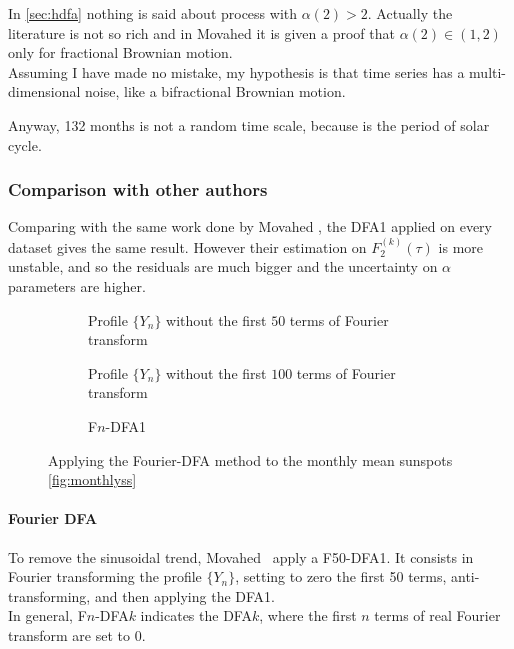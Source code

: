 In \autoref{sec:hdfa} nothing is said about process with $\alpha(2)>2$. Actually the literature is not so rich and in Movahed \etal\cite{Movahed_2006} it is given a proof that $\alpha(2) \in (1, 2)$ only for fractional Brownian motion.\\
Assuming I have made no mistake, my hypothesis is that time series has a multi-dimensional noise, like a bifractional Brownian motion.

Anyway, 132 months is not a random time scale, because is the period of solar cycle.

\subsubsection*{Comparison with other authors}
Comparing with the same work done by Movahed \etal\cite{Movahed_2006}, the DFA1 applied on every dataset gives the same result. However their estimation on $F_2^{( k )}(\tau)$ is more unstable, and so the residuals are much bigger and the  uncertainty on $\alpha$ parameters are higher.

\begin{figure}[!h]
	\centering
	\begin{subfigure}{0.48\textwidth}
		\centering
		
		\caption{Profile $\{Y_n\}$ without the first $50$ terms of Fourier transform}\label{fig:f50}
	\end{subfigure}
	\hfill
	\begin{subfigure}{0.48\textwidth}
		\centering
		
		\caption{Profile $\{Y_n\}$ without the first $100$ terms of Fourier transform}\label{fig:f100}
	\end{subfigure}
	\vfill
	\begin{subfigure}{\textwidth}
		\centering
		
		\caption{F$n$-DFA1\\}
	\end{subfigure}
	\caption{Applying the Fourier-DFA method to the monthly mean sunspots \ref{fig:monthlyss}}\label{fig:fdfa}
\end{figure}

\paragraph{Fourier DFA}
To remove the sinusoidal trend, Movahed \etal \ apply a F50-DFA1. It consists in Fourier transforming the profile $\{ Y_n \}$, setting to zero the first 50 terms, anti-transforming, and then applying the DFA1. \\
In general, F$n$-DFA$k$ indicates the DFA$k$, where the first $n$ terms of real Fourier transform are set to 0.  

